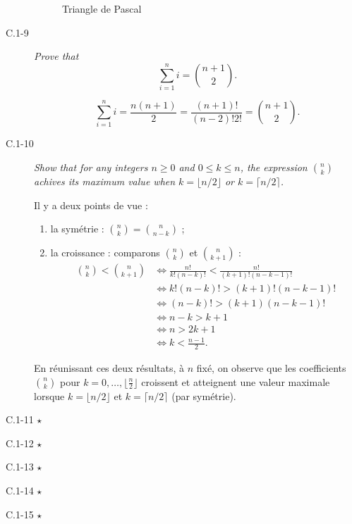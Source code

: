 \begin{description}
\begin{ex}
\begin{figure}[H]
        \caption{Triangle de Pascal}
        \label{fig:}
      \end{figure}
    \end{ex}
  \item[C.1-9] {\itshape Prove that \[ \sum_{i=1}^n i = \binom{n+1}{2}.\]}
    \begin{ex}
      \[\sum_{i=1}^ni = \frac{n(n+1)}{2} = \frac{(n+1)!}{(n-2)!2!} = \binom{n+1}{2}.\]
    \end{ex}
  \item[C.1-10] {\itshape Show that for any integers $n \ge 0$ and $ 0\le k \le n$, the expression $\binom{n}{k}$ achives its maximum value when $k = \lfloor n/2 \rfloor$ or $k = \lceil n/2 \rceil$.}
    \begin{ex}
      Il y a deux points de vue :
      \begin{enumerate}
        \item la sym\'etrie : $\binom{n}{k} = \binom{n}{n-k}$ ;
        \item la croissance :
        comparons $\binom{n}{k}$ et $\binom{n}{k+1}$ : 
        \begin{align*}
          \binom{n}{k} < \binom{n}{k+1} &\iff \frac{n!}{k!(n-k)!} < \frac{n!}{(k+1)!(n-k-1)!}\\
          &\iff k!(n-k)! > (k+1)!(n-k-1)!\\
          &\iff (n-k)! > (k+1)(n-k-1)!\\
          &\iff n-k>k+1\\
          &\iff n > 2k+1\\
          &\iff k<\frac{n-1}{2}.
        \end{align*}
      \end{enumerate}
      En r\'eunissant ces deux r\'esultats, \`a $n$ fix\'e, on observe que les coefficients $\binom{n}{k}$ pour $k = 0, \ldots, \lfloor \frac{n}{2} \rfloor$ croissent et atteignent une valeur maximale lorsque $k = \lfloor n/2 \rfloor$ et $ k = \lceil n/2 \rceil$ (par sym\'etrie).
    \end{ex}

  \item[C.1-11 $\star$] {\itshape }
  \item[C.1-12 $\star$] {\itshape }
  \item[C.1-13 $\star$] {\itshape }
  \item[C.1-14 $\star$] {\itshape }
  \item[C.1-15 $\star$] {\itshape }
\end{description}
